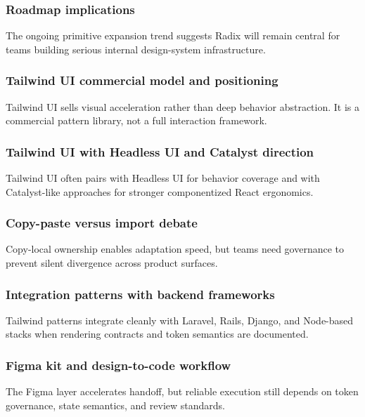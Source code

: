 \documentclass[11pt,twoside,a4paper]{article}
\begin{document}
\subsubsection{Roadmap implications}
The ongoing primitive expansion trend suggests Radix will remain central for teams building serious internal design-system infrastructure.

\subsubsection{Tailwind UI commercial model and positioning}
Tailwind UI sells visual acceleration rather than deep behavior abstraction. It is a commercial pattern library, not a full interaction framework.

\subsubsection{Tailwind UI with Headless UI and Catalyst direction}
Tailwind UI often pairs with Headless UI for behavior coverage and with Catalyst-like approaches for stronger componentized React ergonomics.

\subsubsection{Copy-paste versus import debate}
Copy-local ownership enables adaptation speed, but teams need governance to prevent silent divergence across product surfaces.

\subsubsection{Integration patterns with backend frameworks}
Tailwind patterns integrate cleanly with Laravel, Rails, Django, and Node-based stacks when rendering contracts and token semantics are documented.

\subsubsection{Figma kit and design-to-code workflow}
The Figma layer accelerates handoff, but reliable execution still depends on token governance, state semantics, and review standards.
\end{document}
